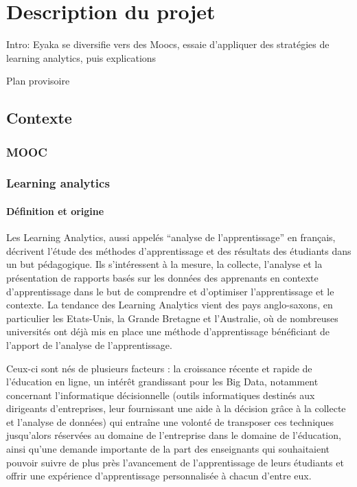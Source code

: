 \chapter{Description du projet}

    Intro: Eyaka se diversifie vers des Moocs, essaie d'appliquer des stratégies de learning analytics, puis explications


    Plan provisoire

    \section{Contexte  }
        \subsection{MOOC  }
        \subsection{Learning analytics }
   
        \subsubsection{Définition et origine}
            
            Les Learning Analytics, aussi appelés \enquote{analyse de l’apprentissage} en français, décrivent l’étude des méthodes d’apprentissage et des résultats des étudiants dans un but pédagogique. Ils s’intéressent à  la mesure, la collecte, l’analyse et la présentation de rapports basés sur les données des apprenants en contexte d’apprentissage dans le but de comprendre et d’optimiser l’apprentissage et le contexte. La tendance des Learning Analytics vient des pays anglo-saxons, en particulier les Etats-Unis, la Grande Bretagne et l’Australie, où de nombreuses universités ont déjà mis en place une méthode d’apprentissage bénéficiant de l’apport de  l’analyse de l’apprentissage.

            Ceux-ci sont nés de plusieurs facteurs : la croissance récente et rapide de l’éducation en ligne, un intérêt grandissant pour les Big Data, notamment concernant l’informatique décisionnelle (outils informatiques destinés aux dirigeants d’entreprises, leur fournissant une aide à la décision grâce à la collecte et l’analyse de données) qui entraîne une volonté de transposer ces techniques jusqu’alors réservées au domaine de l’entreprise dans le domaine de l’éducation, ainsi qu’une demande importante de la part des enseignants qui souhaitaient pouvoir suivre de plus près l’avancement de l’apprentissage de leurs étudiants et offrir une expérience d’apprentissage personnalisée à chacun d’entre eux. 
       
